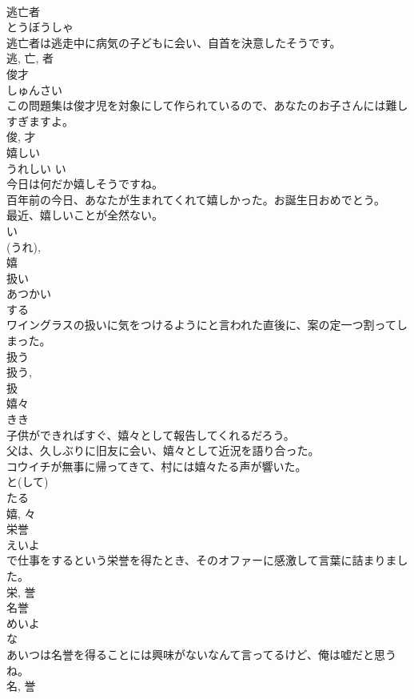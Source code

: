 \documentclass[8pt]{extreport}
\begin{document}
\begin{CJK}{UTF8}{min}
\\	逃亡者	
\\	とうぼうしゃ	
\\	逃亡者は逃走中に病気の子どもに会い、自首を決意したそうです。	
\\	逃, 亡, 者	
\\	俊才	
\\	しゅんさい	
\\	この問題集は俊才児を対象にして作られているので、あなたのお子さんには難しすぎますよ。	
\\	俊, 才	
\\	嬉しい	
\\	うれしい	い 
\\	今日は何だか嬉しそうですね。	
\\	百年前の今日、あなたが生まれてくれて嬉しかった。お誕生日おめでとう。	
\\	最近、嬉しいことが全然ない。	
\\	い 
\\	(うれ), 
\\	嬉	
\\	扱い	
\\	あつかい	
\\	する 
\\	ワイングラスの扱いに気をつけるようにと言われた直後に、案の定一つ割ってしまった。	
\\	扱う 
\\	扱う, 
\\	扱	
\\	嬉々	
\\	きき	
\\	子供ができればすぐ、嬉々として報告してくれるだろう。	
\\	父は、久しぶりに旧友に会い、嬉々として近況を語り合った。	
\\	コウイチが無事に帰ってきて、村には嬉々たる声が響いた。	
\\	と(して) 
\\	たる 
\\	嬉, 々	
\\	栄誉	
\\	えいよ	
\\	で仕事をするという栄誉を得たとき、そのオファーに感激して言葉に詰まりました。	
\\	栄, 誉	
\\	名誉	
\\	めいよ	
\\	な 
\\	あいつは名誉を得ることには興味がないなんて言ってるけど、俺は嘘だと思うね。	
\\	名, 誉	

\end{CJK}
\end{document}

